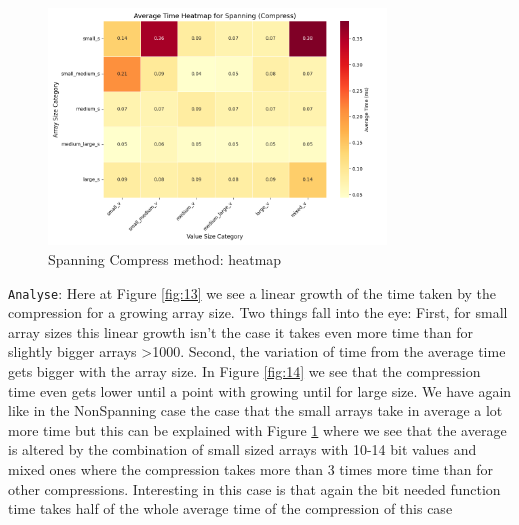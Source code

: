 \documentclass[11pt, a4paper]{article}
\begin{document}
	\begin{figure}[H]%
		\centering
		\includegraphics[width=0.8\textwidth]{Grafics/Spanning/SpanningCompressHeat.png}
		\caption{Spanning Compress method: heatmap}
		\label{fig:15}
	\end{figure}
	\texttt{Analyse}: Here at Figure \ref{fig:13} we see a linear growth of the time taken by the compression for a growing array size. Two things fall into the eye: First, for small array sizes this linear growth isn't the case it takes even more time than for slightly bigger arrays >1000. Second, the variation of time from the average time gets bigger with the array size. In Figure \ref{fig:14} we see that the compression time even gets lower until a point with growing until for large size. We have again like in the NonSpanning case the case that the small arrays take in average a lot more time but this can be explained with Figure \ref{fig:15} where we see that the average is altered by the combination of small sized arrays with 10-14 bit values and mixed ones where the compression takes more than 3 times more time than for other compressions. Interesting in this case is that again the bit needed function time takes half of the whole average time of the compression of this case 
	\par %
	
	
\end{document}
